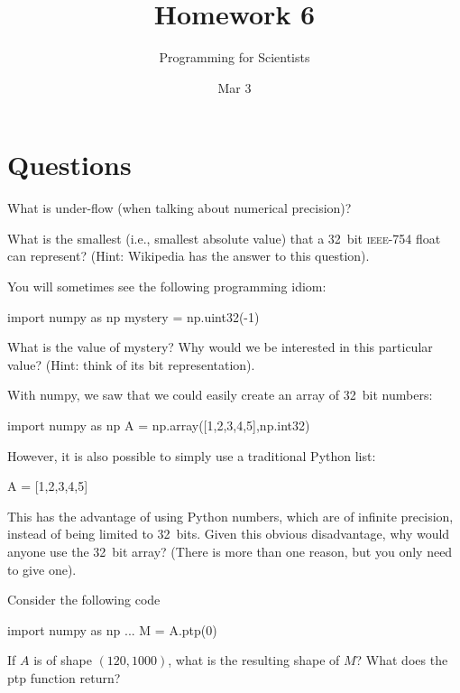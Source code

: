 
\author{Programming for Scientists}
\title{Homework 6}
\date{Mar 3}

\maketitle

\chapter{Questions}

\question %
What is under-flow (when talking about numerical precision)?

\question %
What is the smallest (i.e., smallest absolute value) that a 32~bit \textsc{ieee-754} float can represent? (Hint: Wikipedia has the answer to this question).

\question %
You will sometimes see the following programming idiom:

\begin{python}
import numpy as np
mystery = np.uint32(-1)
\end{python}

What is the value of mystery? Why would we be interested in this particular value? (Hint: think of its bit representation).

\question %
With numpy, we saw that we could easily create an array of 32~bit numbers:

\begin{python}
import numpy as np
A = np.array([1,2,3,4,5],np.int32)
\end{python}

However, it is also possible to simply use a traditional Python list:

\begin{python}
A = [1,2,3,4,5]
\end{python}

This has the advantage of using Python numbers, which are of infinite precision, instead of being limited to 32~bits. Given this obvious disadvantage, why would anyone use the 32~bit array? (There is more than one reason, but you only need to give one).

\question %
Consider the following code

\begin{python}
import numpy as np
...
M = A.ptp(0)
\end{python}

If $A$ is of shape $(120,1000)$, what is the resulting shape of $M$? What does the ptp function return?

